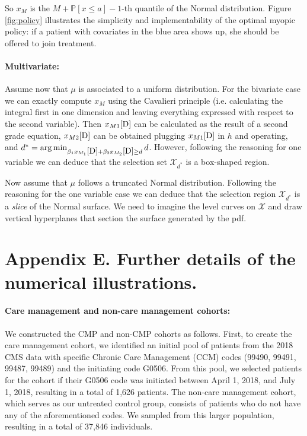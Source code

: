 \documentclass[12pt,a4paper]{article}
\DeclareMathOperator*{\argmin}{arg\,min}
\begin{document}
		So $x_M$ is the $M+\mathbb{P}[x \leq a]-1$-th quantile of the Normal distribution. Figure \ref{fig:policy} illustrates the simplicity and implementability of the optimal myopic policy: if a patient with covariates in the blue area shows up, she should be offered to join treatment.
		
		
		
		\paragraph{Multivariate:}
		
		Assume now that $\mu$ is associated to a uniform distribution. For the bivariate case we can exactly compute $x_M$ using the Cavalieri principle (i.e. calculating the integral first in one dimension and leaving everything expressed with respect to the second variable). Then $x_{M1}\eqref{D}$ can be calculated as the result of a second grade equation, $x_{M2}\eqref{D}$ can be obtained plugging $x_{M1}\eqref{D}$ in  $h$ and operating, and $d^*=\argmin_{\beta_1x_{M_1}\eqref{D}+\beta_2 x_{M_2}\eqref{D} \geq d} d$. However, following the reasoning for one variable we can deduce that the selection set $\mathcal{X}_{d^*}$ is a box-shaped region.
		
		Now assume that $\mu$ follows a truncated Normal distribution. Following the reasoning for the one variable case we can deduce that the selection region $\mathcal{X}_{d^*}$ is a {\it slice} of the Normal surface. We need to imagine the level curves on $\mathcal{X}$ and draw vertical hyperplanes that section the surface generated by the pdf.
		
\section*{Appendix E. Further details of the numerical illustrations.}\label{app:experiment}	
\paragraph{\bf Care management and non-care management cohorts:} 
We constructed the CMP and non-CMP cohorts as follows. First, to create the care management cohort, we identified an initial pool of patients from the 2018 CMS data with specific Chronic Care Management (CCM) codes (99490, 99491, 99487, 99489) and the initiating code G0506. From this pool, we selected patients for the cohort if their G0506 code was initiated between April 1, 2018, and July 1, 2018, resulting in a total of 1,626 patients.
The non-care management cohort, which serves as our untreated control group, consists of patients who do not have any of the aforementioned codes. We sampled from this larger population, resulting in a total of 37,846 individuals.
\end{document}
